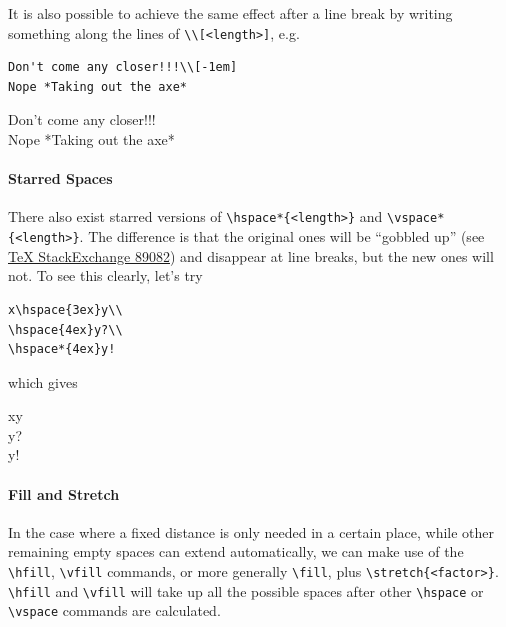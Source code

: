 It is also possible to achieve the same effect after a line break by writing something along the lines of \texttt{\textbackslash\textbackslash [<length>]}, e.g.\
\begin{lstlisting}
Don't come any closer!!!\\[-1em]
Nope *Taking out the axe*
\end{lstlisting}
Don't come any closer!!!\\[-1em]
Nope *Taking out the axe*

\paragraph{Starred Spaces}
There also exist starred versions of \texttt{\textbackslash hspace*\{<length>\}} and \texttt{\textbackslash vspace*\{<length>\}}. The difference is that the original ones will be “gobbled up” (see \href{https://tex.stackexchange.com/questions/89082/hspace-vs-hspace}{{\TeX{} StackExchange 89082}}) and disappear at line breaks, but the new ones will not. To see this clearly, let's try
\begin{lstlisting}
x\hspace{3ex}y\\
\hspace{4ex}y?\\
\hspace*{4ex}y!
\end{lstlisting}
which gives \par
x\hspace{3ex}y\\
\hspace{4ex}y?\\
\hspace*{4ex}y!

\paragraph{Fill and Stretch}
In the case where a fixed distance is only needed in a certain place, while other remaining empty spaces can extend automatically, we can make use of the \texttt{\textbackslash hfill}, \texttt{\textbackslash vfill} commands, or more generally \texttt{\textbackslash fill}, plus \texttt{\textbackslash stretch\{<factor>\}}. \texttt{\textbackslash hfill} and \texttt{\textbackslash vfill} will take up all the possible spaces after other \texttt{\textbackslash hspace} or \texttt{\textbackslash vspace} commands are calculated.

